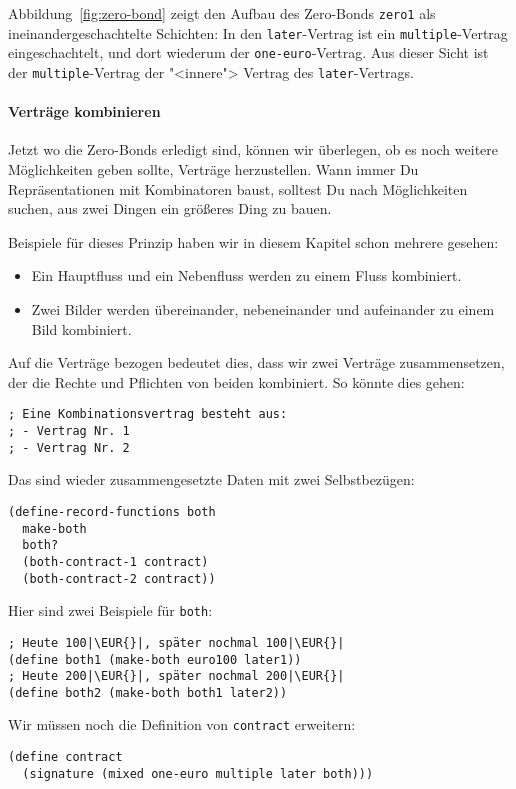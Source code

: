 \noindent Abbildung~\ref{fig:zero-bond} zeigt den Aufbau des
Zero-Bonds \lstinline{zero1} als ineinandergeschachtelte Schichten:
In den \lstinline{later}-Vertrag ist ein \lstinline{multiple}-Vertrag
eingeschachtelt, und dort wiederum der \lstinline{one-euro}-Vertrag.
Aus dieser Sicht ist der \lstinline{multiple}-Vertrag der
"<innere"> Vertrag des \lstinline{later}-Vertrags.

\paragraph{Verträge kombinieren}

Jetzt wo die Zero-Bonds erledigt sind, können wir überlegen, ob es
noch weitere Möglichkeiten geben sollte, Verträge herzustellen.  Wann
immer Du Repräsentationen mit Kombinatoren baust, solltest Du nach
Möglichkeiten suchen, aus zwei Dingen ein größeres Ding zu bauen.

Beispiele für dieses Prinzip haben wir in diesem Kapitel schon mehrere
gesehen:
%
\begin{itemize}
\item Ein Hauptfluss und ein Nebenfluss werden zu einem Fluss
  kombiniert.
\item Zwei Bilder werden übereinander, nebeneinander und aufeinander
  zu einem Bild kombiniert.
\end{itemize}
%
Auf die Verträge bezogen bedeutet dies, dass wir zwei Verträge
zusammensetzen, der die Rechte und Pflichten von beiden kombiniert.
So könnte dies gehen:
%
\begin{lstlisting}
; Eine Kombinationsvertrag besteht aus:
; - Vertrag Nr. 1
; - Vertrag Nr. 2
\end{lstlisting}
%
Das sind wieder zusammengesetzte Daten mit zwei Selbstbezügen:
%
\begin{lstlisting}
(define-record-functions both
  make-both
  both?
  (both-contract-1 contract)
  (both-contract-2 contract))
\end{lstlisting}
%
Hier sind zwei Beispiele für \lstinline{both}:
%
\begin{lstlisting}
; Heute 100|\EUR{}|, später nochmal 100|\EUR{}|
(define both1 (make-both euro100 later1))
; Heute 200|\EUR{}|, später nochmal 200|\EUR{}|
(define both2 (make-both both1 later2))
\end{lstlisting}
%
Wir müssen noch die Definition von \lstinline{contract} erweitern:
%
\begin{lstlisting}
(define contract
  (signature (mixed one-euro multiple later both)))
\end{lstlisting}
%

